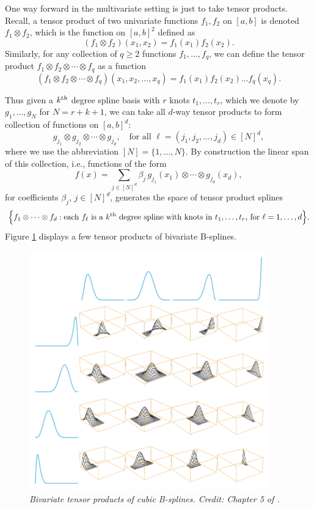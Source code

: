 \documentclass{article}
\begin{document}
One way forward in the multivariate setting is just to take tensor
products. Recall, a tensor product of two univariate functions $f_1,f_2$ on
$[a,b]$ is denoted $f_1 \otimes f_2$, which is the function on $[a,b]^2$ defined
as  
\[
(f_1 \otimes f_2)(x_1, x_2) = f_1(x_1) f_2(x_2). 
\]
Similarly, for any collection of $q \geq 2$ functions $f_1,\dots,f_q$, we can
define the tensor product $f_1 \otimes f_2 \otimes \cdots \otimes f_q$ as a
function 
\[
(f_1 \otimes f_2 \otimes \cdots \otimes f_q)(x_1, x_2, \dots, x_q) = f_1(x_1) 
f_2(x_2) \dots f_q(x_q).
\]

Thus given a $k^{\text{th}}$ degree spline basis with $r$ knots $t_1,\dots,t_r$, which we
denote by $g_1,\dots,g_N$ for $N=r+k+1$, we can take all $d$-way tensor
products to form collection of functions on $[a,b]^d$:
\[
g_{j_1} \otimes g_{j_2} \otimes \cdots \otimes g_{j_d}, \quad \text{for all
  $\ell = (j_1, j_2, \dots, j_d) \in [N]^d$}, 
\]
where we use the abbreviation $[N] = \{1,\dots,N\}$. By construction the linear
span of this collection, i.e., functions of the form    
\[
f(x) = \sum_{j \in [N]^d} \beta_j \, g_{j_1}(x_1) \otimes \cdots \otimes 
g_{j_d}(x_d),   
\]
for coefficients $\beta_j$, $j \in [N]^d$, generates the space of tensor 
product splines 
\[
\Big\{ f_1 \otimes \cdots \otimes f_d : \text{each $f_\ell$ is a $k^{\text{th}}$ degree
  spline with knots in $t_1,\dots,t_r$, for $\ell=1,\dots,d$} \Big\}.  
\]
Figure \ref{fig:tensor} displays a few tensor products of bivariate B-splines.

\begin{figure}[!t]
\centering
\includegraphics[width=0.925\textwidth]{tensor.png}
\caption{\it Bivariate tensor products of cubic B-splines. Credit: Chapter 5 of 
  \citet{hastie2009elements}.}    
\label{fig:tensor}
\end{figure}
\end{document}
